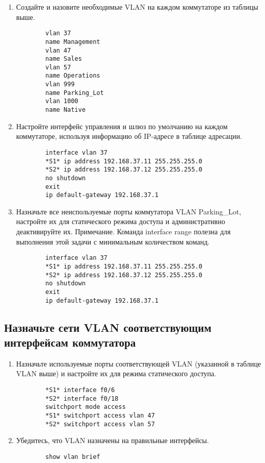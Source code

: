 \begin{enumerate}[a]
    \item Создайте и назовите необходимые VLAN на каждом коммутаторе из таблицы выше.
    \begin{verbatim}
        vlan 37
        name Management
        vlan 47
        name Sales
        vlan 57
        name Operations
        vlan 999
        name Parking_Lot
        vlan 1000
        name Native
    \end{verbatim}

    \item Настройте интерфейс управления и шлюз по умолчанию на каждом коммутаторе, используя
    информацию об IP-адресе в таблице адресации.
    \begin{verbatim}
        interface vlan 37
        *S1* ip address 192.168.37.11 255.255.255.0
        *S2* ip address 192.168.37.12 255.255.255.0
        no shutdown
        exit
        ip default-gateway 192.168.37.1
    \end{verbatim}

    \item Назначьте все неиспользуемые порты коммутатора VLAN Parking\_Lot, настройте их для
    статического режима доступа и административно деактивируйте их.
    Примечание.
    Команда interface range полезна для выполнения этой задачи с минимальным
    количеством команд.
    \begin{verbatim}
        interface vlan 37
        *S1* ip address 192.168.37.11 255.255.255.0
        *S2* ip address 192.168.37.12 255.255.255.0
        no shutdown
        exit
        ip default-gateway 192.168.37.1
    \end{verbatim}
\end{enumerate}

\subsection{Назначьте сети VLAN соответствующим интерфейсам коммутатора}
\begin{enumerate}[a]
    \item Назначьте используемые порты соответствующей VLAN (указанной в таблице VLAN выше) и
    настройте их для режима статического доступа.
    \begin{verbatim}
        *S1* interface f0/6
        *S2* interface f0/18
        switchport mode access
        *S1* switchport access vlan 47
        *S2* switchport access vlan 57
    \end{verbatim}

    \item Убедитесь, что VLAN назначены на правильные интерфейсы.
    \begin{verbatim}
        show vlan brief
    \end{verbatim}
\end{enumerate}
